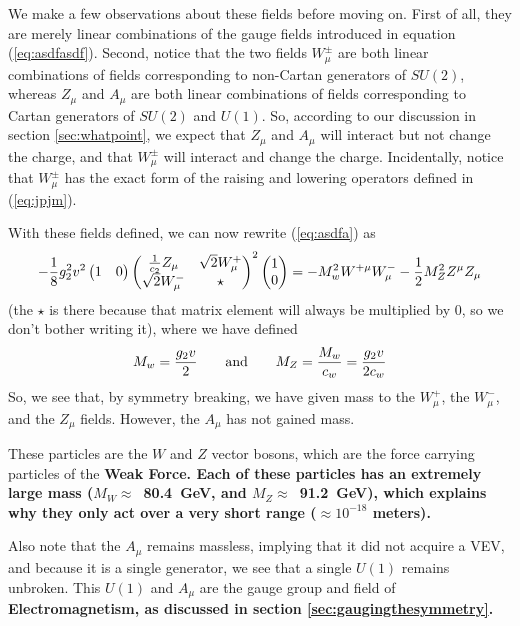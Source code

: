 \documentclass[12pt,epsf]{article}
\def\nolabel{\nonumber }
\def\nolabel{\nonumber }
\begin{document}
We make a few observations about these fields before moving on.  First
of all, they are merely linear combinations of the gauge fields
introduced in equation (\ref{eq:asdfasdf}).  Second, notice that the
two fields $W^{\pm}_{\mu}$ are both linear combinations of fields
corresponding to non-Cartan generators of $SU(2)$, whereas $Z_{\mu}$
and $A_{\mu}$ are both linear combinations of fields corresponding to
Cartan generators of $SU(2)$ and $U(1)$.  So, according to our
discussion in section \ref{sec:whatpoint}, we expect that $Z_{\mu}$ and
$A_{\mu}$ will interact but not change the charge, and that
$W^{\pm}_{\mu}$ will interact and change the charge.  Incidentally,
notice that $W^{\pm}_{\mu}$ has the exact form of the raising and
lowering operators defined in (\ref{eq:jpjm}).

With these fields defined, we can now rewrite (\ref{eq:asdfa}) as 
\begin{eqnarray}
-{1\over 8} g_2^2v^2 
\begin{pmatrix}
1 & 0
\end{pmatrix}
\begin{pmatrix}
{1\over c_2}Z_{\mu} & \sqrt{2}W^+_{\mu} \\
\sqrt{2}W^-_{\mu} & \star
\end{pmatrix}^2
\begin{pmatrix}
1 \\ 0
\end{pmatrix} = -M^2_wW^{+\mu}W^-_{\mu} - {1\over
2}M^2_ZZ^{\mu}Z_{\mu}\nolabel
\end{eqnarray}
(the $\star$ is there because that matrix element will always be
multiplied by 0, so we don't bother writing it), where we have
defined
\begin{eqnarray}
M_w = {g_2 v\over 2} \qquad \mbox{and} \qquad M_Z = {M_w \over c_w} = {g_2 v
\over 2c_w}\nolabel
\end{eqnarray}
So, we see that, by symmetry breaking, we have given mass to the
$W^+_{\mu}$, the $W^-_{\mu}$, and the $Z_{\mu}$ fields.  However, the
$A_{\mu}$ has not gained mass.	

These particles are the $W$ and $Z$ vector bosons, which are the force
carrying particles of the \bf Weak Force\rm.  Each of these particles
has an extremely large mass ($M_W  \approx$~80.4~GeV, and $M_Z \approx$~91.2~GeV),
which explains why they only act over a very short range
($\approx 10^{-18}$ meters).  

Also note that the $A_{\mu}$ remains massless, implying that it did not
acquire a VEV, and because it is a single generator, we see that a
single $U(1)$ remains unbroken.  This $U(1)$ and $A_{\mu}$ are the
gauge group and field of \bf Electromagnetism\rm, as discussed in
section \ref{sec:gaugingthesymmetry}.  
\end{document}

